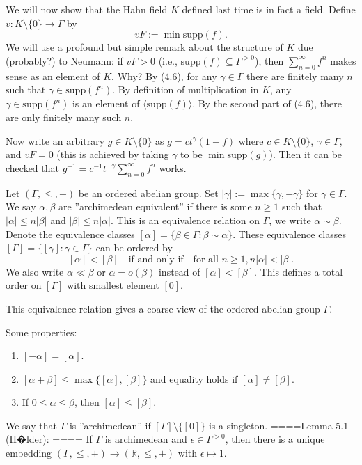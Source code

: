 
We will now show that the Hahn field $K$ defined last time is in fact a field. Define $v:K\setminus \{0\}\rightarrow \Gamma$ by $$vF:=\min \mathrm{supp}(f).$$ We will use a profound but simple remark about the structure of $K$ due (probably?) to Neumann: if $vF>0$ (i.e., $\mathrm{supp}(f)\subseteq \Gamma^{>0}$), then $\sum_{n=0}^\infty f^n$ makes sense as an element of $K$. Why? By (4.6), for any $\gamma\in \Gamma$ there are finitely many $n$ such that $\gamma\in\mathrm{supp}(f^n)$. By definition of multiplication in $K$, any $\gamma\in \mathrm{supp}(f^n)$ is an element of $\langle \mathrm{supp}(f)\rangle$. By the second part of (4.6), there are only finitely many such $n$.

Now write an arbitrary $g\in K\setminus \{0\}$ as $g=ct^\gamma(1-f)$ where $c\in K\setminus \{0\}$, $\gamma\in \Gamma$, and $vF=0$ (this is achieved by taking $\gamma$ to be $\min\mathrm{supp}(g)$). Then it can be checked that $g^{-1}=c^{-1}t^{-\gamma}\sum_{n=0}^\infty f^n$ works.

Let $(\Gamma, \le, +)$ be an ordered abelian group. Set $|\gamma|:=\max\{\gamma, -\gamma\}$ for $\gamma\in \Gamma$. We say $\alpha,\beta$ are ''archimedean equivalent'' if there is some $n\ge 1$ such that $|\alpha|\le n|\beta|$ and $|\beta|\le n|\alpha|$. This is an equivalence relation on $\Gamma$, we write $\alpha\sim\beta$. Denote the equivalence classes $[\alpha]=\{\beta\in\Gamma:\beta\sim\alpha\}$. These equivalence classes $[\Gamma]=\{[\gamma]:\gamma\in\Gamma\}$ can be ordered by 
$$[\alpha]<[\beta]\quad \textrm{if and only if} \quad \textrm{for all }n\ge 1, n|\alpha|<|\beta|.$$
We also write $\alpha\ll\beta$ or $\alpha=o(\beta)$ instead of $[\alpha]<[\beta]$. This defines a total order on $[\Gamma]$ with smallest element $[0]$.

This equivalence relation gives a coarse view of the ordered abelian group $\Gamma$.

Some properties:
\begin{enumerate}
  \item  $[-\alpha]=[\alpha]$.
  \item  $[\alpha+\beta]\le \max\{[\alpha],[\beta]\}$ and equality holds if $[\alpha]\neq [\beta]$.
  \item  If $0\le \alpha\le \beta$, then $[\alpha]\le [\beta]$.
\end{enumerate}

We say that $\Gamma$ is ''archimedean'' if $[\Gamma]\setminus \{[0]\}$ is a singleton.
====Lemma 5.1 (H�lder): ====
If $\Gamma$ is archimedean and $\epsilon\in \Gamma^{>0}$, then there is a unique embedding $(\Gamma,\le,+)\rightarrow (\mathbb{R},\le,+)$ with $\epsilon\mapsto 1$.

